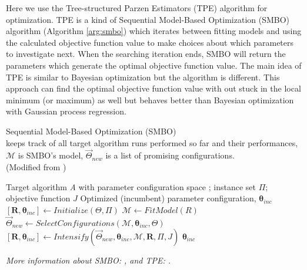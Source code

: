 Here we use the Tree-structured Parzen Estimators (TPE) algorithm for optimization. 
TPE is a kind of Sequential Model-Based Optimization (SMBO) algorithm (Algorithm \ref{arg:smbo}) which iterates between fitting models and using the calculated objective function value to make choices about which parameters to investigate next.
When the searching iteration ends, SMBO will return the parameters which generate the optimal objective function value.
The main idea of TPE is similar to Bayesian optimization but the algorithm is different.
This approach can find the optimal objective function value with out stuck in the local minimum (or maximum) as well but behaves better than Bayesian optimization with Gaussian process regression.

\begin{algorithm}
    \caption{
        Sequential Model-Based Optimization (SMBO) \\
         keeps track of all target algorithm runs performed so far and their performances, 
        $\mathcal{M}$ is SMBO's model, 
        $\bm{\vec{\varTheta }}_{new}$ is a list of promising configurations. \\
        (Modified from \citep{hutter2011sequential})
        }
    \label{arg:smbo}
    \begin{algorithmic}[1]
        \REQUIRE Target algorithm \textit{A} with parameter configuration space \bm{$\varTheta$}; instance set
        $\varPi$; objective function $J$
        \ENSURE Optimized (incumbent) parameter configuration, $\bm{\theta}_{inc}$
        \STATE $[\bm{R}, \bm{\theta}_{inc}] \leftarrow Initialize(\bm{\varTheta}, \varPi)$
        \REPEAT 
            \STATE $\mathcal{M} \leftarrow FitModel(R)$
            \STATE $\bm{\vec{\varTheta}}_{new} \leftarrow SelectConfigurations(\mathcal{M}, \bm{\theta}_{inc}, \bm{\varTheta})$
            \STATE $[\bm{R}, \bm{\theta}_{inc}] \leftarrow Intensify(\bm{\vec{\varTheta}}_{new}, \bm{\theta}_{inc}, \mathcal{M}, \bm{R}, \varPi, J)$
        \RETURN $\bm{\theta}_{inc}$
    \end{algorithmic}
\end{algorithm}

\textit{
    More information about SMBO: \citep{hutter2011sequential}, 
    and TPE: \citep{bergstra2011algorithms}.
}
